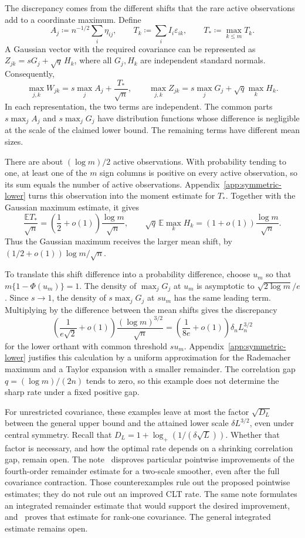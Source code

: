 \documentclass[11pt,letterpaper]{article}
\theoremstyle{remark}
\newcommand{\E}{\mathbb E}
\begin{document}
The discrepancy comes from the different shifts that the rare active
observations add to a coordinate maximum. Define
\[
 A_j\coloneqq n^{-1/2}\sum_i\eta_{ij},\qquad
 T_k\coloneqq\sum_i I_i\varepsilon_{ik},\qquad
 T_*\coloneqq\max_{k\le m}T_k.
\]
A Gaussian vector with the required covariance can be represented as
\(Z_{jk}=sG_j+\sqrt q\,H_k\), where all \(G_j,H_k\) are independent
standard normals. Consequently,
\[
 \max_{j,k}W_{jk}=s\max_jA_j+\frac{T_*}{\sqrt n},
 \qquad
 \max_{j,k}Z_{jk}=s\max_jG_j+\sqrt q\max_kH_k.
\]
In each representation, the two terms are independent. The common
parts \(s\max_jA_j\) and \(s\max_jG_j\) have distribution functions
whose difference is negligible at the scale of the claimed lower bound.
The remaining terms have different mean sizes.

There are about \((\log m)/2\) active observations. With probability
tending to one, at least one of the \(m\) sign columns is positive
on every active observation, so its sum equals the number of active
observations. Appendix~\ref{app:symmetric-lower} turns this observation
into the moment estimate for \(T_*\). Together with the Gaussian
maximum estimate, it gives
\[
 \frac{\E T_*}{\sqrt n}
 =\left(\frac12+o(1)\right)\frac{\log m}{\sqrt n},
 \qquad
 \sqrt q\,\E\max_kH_k
 =(1+o(1))\frac{\log m}{\sqrt n}.
\]
Thus the Gaussian maximum receives the larger mean shift, by
\((1/2+o(1))\log m/\sqrt n\).

To translate this shift difference into a probability difference,
choose \(u_m\) so that \(m\{1-\Phi(u_m)\}=1\). The density of
\(\max_jG_j\) at \(u_m\) is asymptotic to
\(\sqrt{2\log m}/e\). Since \(s\to1\), the density of
\(s\max_jG_j\) at \(s u_m\) has the same leading term.
Multiplying by the difference between the mean shifts gives the discrepancy
\[
 \left(\frac1{e\sqrt2}+o(1)\right)
       \frac{(\log m)^{3/2}}{\sqrt n}
 =\left(\frac1{8e}+o(1)\right)\delta_nL_n^{3/2}
\]
for the lower orthant with common threshold \(s u_m\).
Appendix~\ref{app:symmetric-lower} justifies this calculation by a
uniform approximation for the Rademacher maximum and a Taylor
expansion with a smaller remainder. The correlation gap
\(q=(\log m)/(2n)\) tends to zero, so this example does not determine
the sharp rate under a fixed positive gap.

For unrestricted covariance, these examples leave at most the factor
\(\sqrt{D_L}\) between the general upper bound and the attained lower
scale \(\delta L^{3/2}\), even under central symmetry. Recall that
\(D_L=1+\log_+(1/(\delta\sqrt L))\). Whether that factor is necessary,
and how the optimal rate depends on a shrinking correlation gap,
remain open. The note~\cite{Obstruction} disproves particular
pointwise improvements of the fourth-order remainder estimate for a
two-scale smoother, even after the full covariance contraction.
Those counterexamples rule out the proposed pointwise estimates;
they do not rule out an improved CLT rate. The same note formulates
an integrated remainder estimate that would support the desired
improvement, and~\cite{IntegratedRemainder} proves that estimate for
rank-one covariance. The general integrated estimate remains open.
\end{document}
